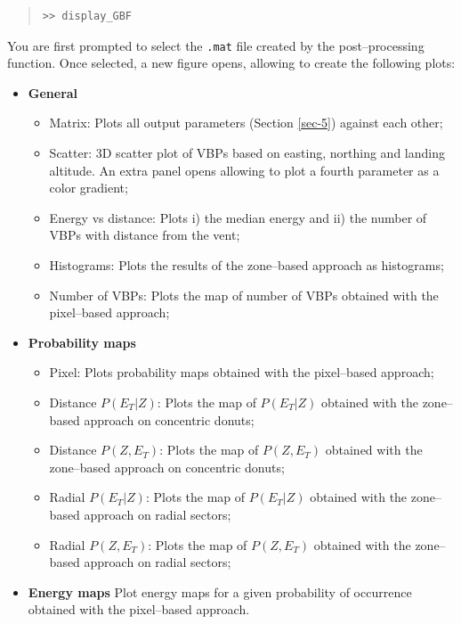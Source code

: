 \documentclass[10pt,a4paper]{article}
\begin{document}
\begin{quote}
\begin{verbatim}
>> display_GBF
\end{verbatim}
\end{quote}

You are first prompted to select the \verb|.mat| file created by the post--processing function. Once selected, a new figure opens, allowing to create the following plots:

\begin{itemize}
\item \textbf{General}
	\begin{itemize}
	\item \textsf{\color{namecolor}Matrix:} Plots all output parameters (Section \ref{sec-5}) against each other;
	\item \textsf{\color{namecolor}Scatter:} 3D scatter plot of VBPs based on easting, northing and landing altitude. An extra panel opens allowing to plot a fourth parameter as a color gradient;
	\item \textsf{\color{namecolor}Energy vs distance:} Plots i) the median energy and ii) the number of VBPs with distance from the vent;
	\item \textsf{\color{namecolor}Histograms:} Plots the results of the zone--based approach as histograms;
	\item \textsf{\color{namecolor}Number of VBPs:} Plots the map of number of VBPs obtained with the pixel--based approach;
	\end{itemize}
\item \textbf{Probability maps}
	\begin{itemize}
	\item \textsf{\color{namecolor}Pixel:} Plots probability maps obtained with the pixel--based approach;
	\item \textsf{\color{namecolor}Distance $P(E_T \vert Z)$:} Plots the map of $P(E_T \vert Z)$ obtained with the zone--based approach on concentric donuts;
	\item \textsf{\color{namecolor}Distance $P(Z, E_T)$:}  Plots the map of $P(Z, E_T)$ obtained with the zone--based approach on concentric donuts;
	\item \textsf{\color{namecolor}Radial $P(E_T \vert Z)$:} Plots the map of $P(E_T \vert Z)$ obtained with the zone--based approach on radial sectors;
	\item \textsf{\color{namecolor}Radial $P(Z, E_T)$:} Plots the map of $P(Z, E_T)$ obtained with the zone--based approach on radial sectors;
	\end{itemize}
\item \textbf{Energy maps} Plot energy maps for a given probability of occurrence obtained with the pixel--based approach.
\end{itemize}
\end{document}
